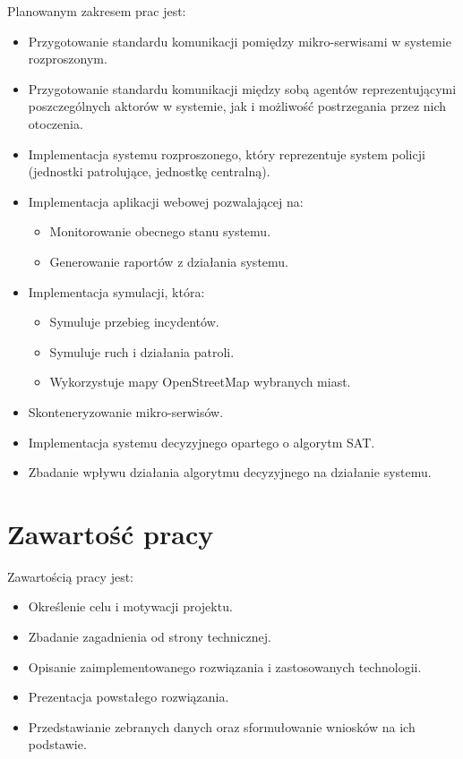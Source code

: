 Planowanym zakresem prac jest:
\begin{itemize}
    \item Przygotowanie standardu komunikacji pomiędzy mikro-serwisami w systemie rozproszonym.
    \item Przygotowanie standardu komunikacji między sobą agentów reprezentującymi poszczególnych aktorów w systemie, jak i możliwość postrzegania przez nich otoczenia.
    \item Implementacja systemu rozproszonego, który reprezentuje system policji (jednostki patrolujące, jednostkę centralną).
    \item Implementacja aplikacji webowej pozwalającej na:
    \begin{itemize}
        \item Monitorowanie obecnego stanu systemu.
        \item Generowanie raportów z działania systemu. %
    \end{itemize}
    \item Implementacja symulacji, która:
    \begin{itemize}
        \item Symuluje przebieg incydentów.
        \item Symuluje ruch i działania patroli.
        \item Wykorzystuje mapy OpenStreetMap wybranych miast.
    \end{itemize}
    \item Skonteneryzowanie mikro-serwisów.
    \item Implementacja systemu decyzyjnego opartego o algorytm SAT. %
    \item Zbadanie wpływu działania algorytmu decyzyjnego na działanie systemu. %
\end{itemize}

\section{Zawartość pracy}
\label{sec:zawartoscPracy}

Zawartością pracy jest:
\begin{itemize}
    \item Określenie celu i motywacji projektu.
    \item Zbadanie zagadnienia od strony technicznej.
    \item Opisanie zaimplementowanego rozwiązania i zastosowanych technologii.
    \item Prezentacja powstałego rozwiązania.
    \item Przedstawianie zebranych danych oraz sformułowanie wniosków na ich podstawie.
\end{itemize}